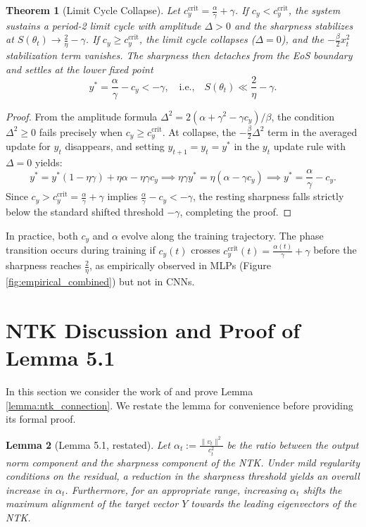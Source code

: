 \documentclass{article}
\newtheorem{theorem}{Theorem}[section]
\newtheorem{lemma}[theorem]{Lemma}
\begin{document}
\begin{theorem}[Limit Cycle Collapse]
\label{app:model_theorem}
Let $c_y^{\mathrm{crit}} = \frac{\alpha}{\gamma} + \gamma$. If $c_y < c_y^{\mathrm{crit}}$, the system sustains a period-2 limit cycle with amplitude $\Delta > 0$ and the sharpness stabilizes at $S(\theta_t) \to \frac{2}{\eta} - \gamma$. If $c_y \geq c_y^{\mathrm{crit}}$, the limit cycle collapses ($\Delta = 0$), and the $-\frac{\beta}{2}x_t^2$ stabilization term vanishes. The sharpness then detaches from the EoS boundary and settles at the lower fixed point
\[
    y^* = \frac{\alpha}{\gamma} - c_y < -\gamma,
    \quad\text{i.e.,}\quad
    S(\theta_t) \ll \frac{2}{\eta} - \gamma.
\]
\end{theorem}
\begin{proof}
From the amplitude formula $\Delta^2 = 2(\alpha + \gamma^2 - \gamma c_y)/\beta$, the condition $\Delta^2 \geq 0$ fails precisely when $c_y \geq c_y^{\mathrm{crit}}$. At collapse, the $-\frac{\beta}{2}\Delta^2$ term in the averaged update for $y_t$ disappears, and setting $y_{t+1} = y_t = y^*$ in the $y_t$ update rule with $\Delta = 0$ yields:
\[
    y^* = y^*(1-\eta\gamma) + \eta\alpha - \eta\gamma c_y
    \implies
    \eta\gamma y^* = \eta(\alpha - \gamma c_y)
    \implies
    y^* = \frac{\alpha}{\gamma} - c_y.
\]
Since $c_y > c_y^{\mathrm{crit}} = \frac{\alpha}{\gamma} + \gamma$ implies $\frac{\alpha}{\gamma} - c_y < -\gamma$, the resting sharpness falls strictly below the standard shifted threshold $-\gamma$, completing the proof.
\end{proof}

In practice, both $c_y$ and $\alpha$ evolve along the training trajectory. The phase transition occurs during training if $c_y(t)$ crosses $c_y^{\mathrm{crit}}(t) = \frac{\alpha(t)}{\gamma} + \gamma$ before the sharpness reaches $\frac{2}{\eta}$, as empirically observed in MLPs (Figure \ref{fig:empirical_combined}) but not in CNNs.

\newpage

\section{NTK Discussion and Proof of Lemma 5.1}
\label{app:ntk_connection}

In this section we consider the work of \citep{ntk_eos} and prove Lemma \ref{lemma:ntk_connection}. We restate the lemma for convenience before providing its formal proof.

\begin{lemma}[Lemma 5.1, restated]
Let $\alpha_t := \frac{\|v_t\|^2} {c_t^2}$ be the ratio between the output norm component and the sharpness component of the NTK. Under mild regularity conditions on the residual, a reduction in the sharpness threshold yields an overall increase in $\alpha_t$. Furthermore, for an appropriate range, increasing $\alpha_t$ shifts the maximum alignment of the target vector $Y$ towards the leading eigenvectors of the NTK.
\end{lemma}
\end{document}
